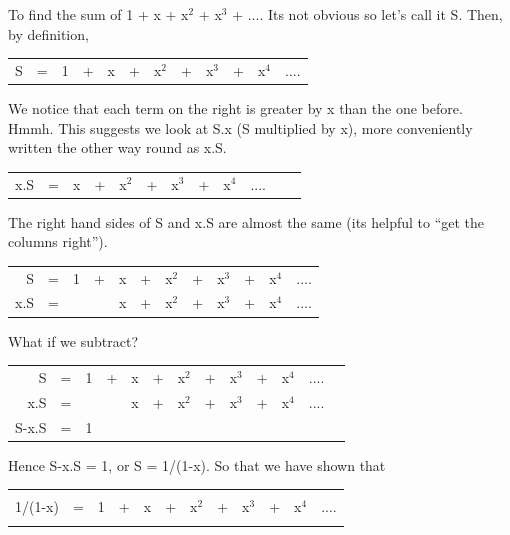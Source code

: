 \documentclass[12pt,fleqn]{report}
\begin{document}
To find the sum of 1 + x + x$^2$ + x$^3$ + ....
Its not obvious so let's call it S. Then, by definition,

\begin{tabular}{r cc cc cc cc ccc}
S & = & 1 & + & x & + & x$^2$ & + & x$^3$ & + & x$^4$ & .... \\
\end{tabular}

\noindent
We notice that each term on the right is greater by x than the one
before.
Hmmh. This suggests we look at  S.x (S multiplied by x), 
more conveniently written the other way round as x.S.

\begin{tabular}{r cc cc cc cc ccc}
x.S & = & x & + & x$^2$ & + & x$^3$ & + & x$^4$ &  .... \\
\end{tabular}

\noindent
The right hand sides of S and x.S are almost the same
(its helpful to ``get the columns right'').


\begin{tabular}{r cc cc cc cc ccc}
S   & = & 1 & + & x & + & x$^2$ & + & x$^3$ & + & x$^4$ & .... \\
x.S & = &   &   & x & + & x$^2$ & + & x$^3$ & + & x$^4$ &  .... \\
\end{tabular}


\noindent
What if we subtract? 

\begin{tabular}{r cc cc cc cc ccc c}
S   & = & 1 & + & x & + & x$^2$ & + & x$^3$ & + & x$^4$ & .... \\
x.S & = &   &   & x & + & x$^2$ & + & x$^3$ & + & x$^4$ &  .... \\
\hline
S-x.S & = & 1 & \\
\hline
\end{tabular}

\noindent
Hence  S-x.S = 1, or S = 1/(1-x). So that we have shown that

\begin{table}[hbt]\centering
\begin{tabular}{||r cc cc cc cc ccc||}
\hline
&&&&&&&&&&&\\
\hspace*{0.25in}
1/(1-x)
  & = & 
1 & + & x & + & x$^2$ & + & x$^3$ & + & x$^4$ & .... 
\hspace*{0.25in}\\
&&&&&&&&&&&\\
\hline
\end{tabular}
\end{table}
\end{document}
